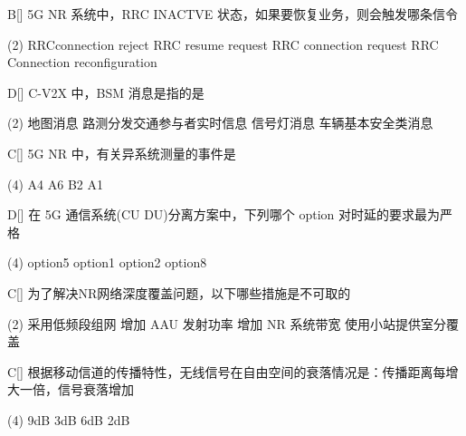 \begin{choice}{B}[]
    5G NR 系统中，RRC INACTVE 状态，如果要恢复业务，则会触发哪条信令
    \begin{tasks}(2)
        \task RRC\;connection\; reject
        \task RRC\; resume \;request
        \task RRC \;connection\; request
        \task  RRC \;Connection \;reconfiguration
    \end{tasks}
\end{choice}

\begin{choice}{D}[]
    C-V2X 中，BSM 消息是指的是
    \begin{tasks}(2)
        \task 地图消息
        \task 路测分发交通参与者实时信息
        \task 信号灯消息
        \task  车辆基本安全类消息
    \end{tasks}
\end{choice}




\begin{choice}{C}[]
    5G NR 中，有关异系统测量的事件是
    \begin{tasks}(4)
        \task A4
        \task A6
        \task B2
        \task A1
    \end{tasks}
\end{choice}


\begin{choice}{D}[]
    在 5G 通信系统(CU DU)分离方案中，下列哪个 option 对时延的要求最为严格
    \begin{tasks}(4)
        \task  option5
        \task option1
        \task option2
        \task  option8
    \end{tasks}
\end{choice}

\begin{choice}{C}[]
    为了解决NR网络深度覆盖问题，以下哪些措施是不可取的
    \begin{tasks}(2)
        \task 采用低频段组网
        \task 增加 AAU 发射功率
        \task 增加 NR 系统带宽
        \task 使用小站提供室分覆盖
    \end{tasks}
\end{choice}


\begin{choice}{C}[]
    根据移动信道的传播特性，无线信号在自由空间的衰落情况是：传播距离每增大一倍，信号衰落增加
    \begin{tasks}(4)
        \task 9dB
        \task 3dB
        \task 6dB
        \task 2dB
    \end{tasks}
\end{choice}


